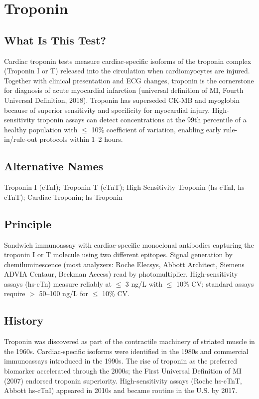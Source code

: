 \chapter{Troponin}

\section*{What Is This Test?}
Cardiac troponin tests measure cardiac-specific isoforms of the troponin complex (Troponin I or T) released into the circulation when cardiomyocytes are injured. Together with clinical presentation and ECG changes, troponin is the cornerstone for diagnosis of acute myocardial infarction (universal definition of MI, Fourth Universal Definition, 2018). Troponin has superseded CK-MB and myoglobin because of superior sensitivity and specificity for myocardial injury. High-sensitivity troponin assays can detect concentrations at the 99th percentile of a healthy population with $\leq$ 10\% coefficient of variation, enabling early rule-in/rule-out protocols within 1--2 hours.

\section*{Alternative Names}
Troponin I (cTnI); Troponin T (cTnT); High-Sensitivity Troponin (hs-cTnI, hs-cTnT); Cardiac Troponin; hs-Troponin

\section*{Principle}
Sandwich immunoassay with cardiac-specific monoclonal antibodies capturing the troponin I or T molecule using two different epitopes. Signal generation by chemiluminescence (most analyzers: Roche Elecsys, Abbott Architect, Siemens ADVIA Centaur, Beckman Access) read by photomultiplier. High-sensitivity assays (hs-cTn) measure reliably at $\leq$ 3 ng/L with $\leq$ 10\% CV; standard assays require $>$ 50--100 ng/L for $\leq$ 10\% CV.

\section*{History}
Troponin was discovered as part of the contractile machinery of striated muscle in the 1960s. Cardiac-specific isoforms were identified in the 1980s and commercial immunoassays introduced in the 1990s. The rise of troponin as the preferred biomarker accelerated through the 2000s; the First Universal Definition of MI (2007) endorsed troponin superiority. High-sensitivity assays (Roche hs-cTnT, Abbott hs-cTnI) appeared in 2010s and became routine in the U.S. by 2017.

